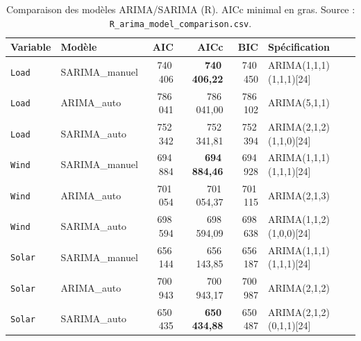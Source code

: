 \begin{table}[H]
\centering
\caption{Comparaison des modèles ARIMA/SARIMA (R). AICc minimal en gras.
Source : \texttt{R\_arima\_model\_comparison.csv}.}
\label{tab:arima_comp_r}
\small
\begin{tabular}{llrrrl}
\toprule
Variable & Modèle & AIC & AICc & BIC & Spécification \\
\midrule
\texttt{Load}  & SARIMA\_manuel & 740\,406 & \textbf{740\,406{,}22} & 740\,450 & ARIMA(1,1,1)(1,1,1)[24] \\
\texttt{Load}  & ARIMA\_auto    & 786\,041 & 786\,041{,}00 & 786\,102 & ARIMA(5,1,1) \\
\texttt{Load}  & SARIMA\_auto   & 752\,342 & 752\,341{,}81 & 752\,394 & ARIMA(2,1,2)(1,1,0)[24] \\
\texttt{Wind}  & SARIMA\_manuel & 694\,884 & \textbf{694\,884{,}46} & 694\,928 & ARIMA(1,1,1)(1,1,1)[24] \\
\texttt{Wind}  & ARIMA\_auto    & 701\,054 & 701\,054{,}37 & 701\,115 & ARIMA(2,1,3) \\
\texttt{Wind}  & SARIMA\_auto   & 698\,594 & 698\,594{,}09 & 698\,638 & ARIMA(1,1,2)(1,0,0)[24] \\
\texttt{Solar} & SARIMA\_manuel & 656\,144 & 656\,143{,}85 & 656\,187 & ARIMA(1,1,1)(1,1,1)[24] \\
\texttt{Solar} & ARIMA\_auto    & 700\,943 & 700\,943{,}17 & 700\,987 & ARIMA(2,1,2) \\
\texttt{Solar} & SARIMA\_auto   & 650\,435 & \textbf{650\,434{,}88} & 650\,487 & ARIMA(2,1,2)(0,1,1)[24] \\
\bottomrule
\end{tabular}
\end{table}

